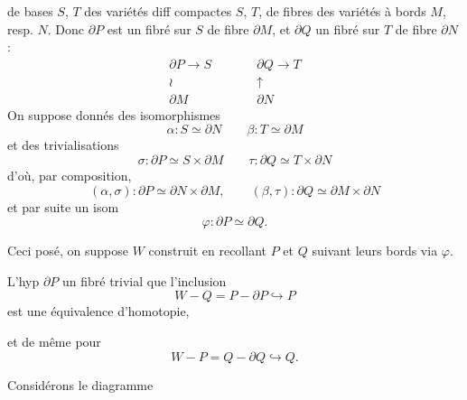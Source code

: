 \documentclass[11pt,a4paper]{article}
\begin{document}
de bases $S$, $T$ des variétés diff compactes $S$, $T$, de
fibres des variétés à bords $M$, resp. $N$. Donc $\partial P$ est un fibré sur
$S$ de fibre $\partial M$, et $\partial Q$ un fibré sur $T$ de fibre
$\partial N$ :
\[
  \begin{array}{ccc}
    \partial P \longrightarrow S & \qquad & \partial Q \longrightarrow T \\
    \wr & & \uparrow \\
    \partial M & & \partial N
  \end{array}
\]
On suppose donnés des isomorphismes
\[
  \alpha : S \simeq \partial N \qquad \beta : T \simeq \partial M
\]
et  des trivialisations
\[
  \sigma : \partial P \simeq S \times \partial M \qquad
  \tau : \partial Q \simeq T \times \partial N
\]
d'où, par composition,
\[
  (\alpha, \sigma) : \partial P \simeq \partial N \times \partial M, \qquad
  (\beta, \tau) : \partial Q \simeq \partial M \times \partial N
\]
et par suite un isom
\[
  \varphi : \partial P \simeq \partial Q .
\]


Ceci posé, on suppose $W$ construit en recollant $P$ et $Q$ suivant leurs bords
\struck{\ill{}} via $\varphi$.

 

L'hyp \ill{}  $\partial P$  un fibré
trivial  \ill{}  que l'inclusion \struck{\ill{}}
\[
  W - Q = P - \partial P \hookrightarrow P
\]
est une équivalence d'homotopie, \struck{\ill{}}

et de même pour
\[
  W - P = Q - \partial Q \hookrightarrow Q .
\]
\struck{\ill{} \ill{}}

Considérons le diagramme

\end{document}
